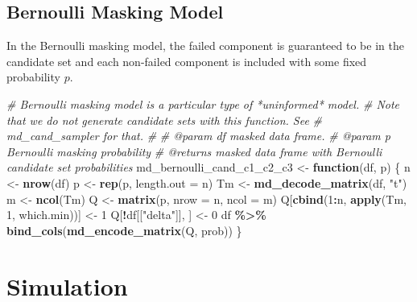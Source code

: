 \documentclass[
]{article}
\newenvironment{Shaded}{\begin{snugshade}}{\end{snugshade}}
\newcommand{\CommentTok}[1]{\textcolor[rgb]{0.56,0.35,0.01}{\textit{#1}}}
\newcommand{\ControlFlowTok}[1]{\textcolor[rgb]{0.13,0.29,0.53}{\textbf{#1}}}
\newcommand{\DataTypeTok}[1]{\textcolor[rgb]{0.13,0.29,0.53}{#1}}
\newcommand{\DecValTok}[1]{\textcolor[rgb]{0.00,0.00,0.81}{#1}}
\newcommand{\KeywordTok}[1]{\textcolor[rgb]{0.13,0.29,0.53}{\textbf{#1}}}
\newcommand{\NormalTok}[1]{#1}
\newcommand{\OperatorTok}[1]{\textcolor[rgb]{0.81,0.36,0.00}{\textbf{#1}}}
\newcommand{\StringTok}[1]{\textcolor[rgb]{0.31,0.60,0.02}{#1}}
\theoremstyle{definition}
\theoremstyle{plain}
\theoremstyle{definition}
\theoremstyle{definition}
\theoremstyle{definition}
\theoremstyle{definition}
\theoremstyle{remark}
\begin{document}
\hypertarget{app-cand-model-r}{%
\subsection{Bernoulli Masking Model}\label{app-cand-model-r}}

In the Bernoulli masking model, the failed component is guaranteed to be in the
candidate set and each non-failed component is included with some fixed
probability \(p\).

\begin{Shaded}
\begin{Highlighting}[]
\CommentTok{\#\textquotesingle{} Bernoulli masking model is a particular type of *uninformed* model.}
\CommentTok{\#\textquotesingle{} Note that we do not generate candidate sets with this function. See}
\CommentTok{\#\textquotesingle{} \textasciigrave{}md\_cand\_sampler\textasciigrave{} for that.}
\CommentTok{\#\textquotesingle{}}
\CommentTok{\#\textquotesingle{} @param df masked data frame.}
\CommentTok{\#\textquotesingle{} @param p Bernoulli masking probability}
\CommentTok{\#\textquotesingle{} @returns masked data frame with Bernoulli candidate set probabilities}
\NormalTok{md\_bernoulli\_cand\_c1\_c2\_c3 \textless{}{-}}\StringTok{ }\ControlFlowTok{function}\NormalTok{(df, p) \{}
\NormalTok{  n \textless{}{-}}\StringTok{ }\KeywordTok{nrow}\NormalTok{(df)}
\NormalTok{  p \textless{}{-}}\StringTok{ }\KeywordTok{rep}\NormalTok{(p, }\DataTypeTok{length.out =}\NormalTok{ n)}
\NormalTok{  Tm \textless{}{-}}\StringTok{ }\KeywordTok{md\_decode\_matrix}\NormalTok{(df, }\StringTok{"t"}\NormalTok{)}
\NormalTok{  m \textless{}{-}}\StringTok{ }\KeywordTok{ncol}\NormalTok{(Tm)}
\NormalTok{  Q \textless{}{-}}\StringTok{ }\KeywordTok{matrix}\NormalTok{(p, }\DataTypeTok{nrow =}\NormalTok{ n, }\DataTypeTok{ncol =}\NormalTok{ m)}
\NormalTok{  Q[}\KeywordTok{cbind}\NormalTok{(}\DecValTok{1}\OperatorTok{:}\NormalTok{n, }\KeywordTok{apply}\NormalTok{(Tm, }\DecValTok{1}\NormalTok{, which.min))] \textless{}{-}}\StringTok{ }\DecValTok{1}
\NormalTok{  Q[}\OperatorTok{!}\NormalTok{df[[}\StringTok{"delta"}\NormalTok{]], ] \textless{}{-}}\StringTok{ }\DecValTok{0}
\NormalTok{  df }\OperatorTok{\%\textgreater{}\%}\StringTok{ }\KeywordTok{bind\_cols}\NormalTok{(}\KeywordTok{md\_encode\_matrix}\NormalTok{(Q, prob))}
\NormalTok{\}}
\end{Highlighting}
\end{Shaded}

\hypertarget{simulation}{%
\section{Simulation}\label{simulation}}
\end{document}

